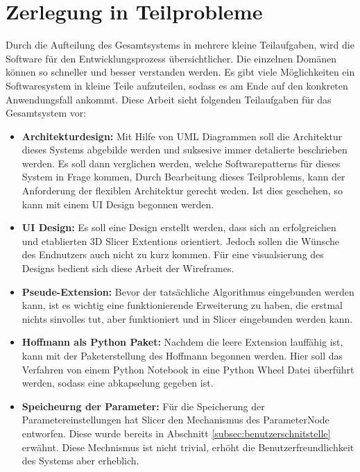 \section{Zerlegung in Teilprobleme}
\label{sec_zerlegung_in_teilprobleme} Durch die Aufteilung des Gesamtsystems in mehrere
kleine Teilaufgaben, wird die Software für den Entwicklungsprozess
übersichtlicher. Die einzelnen Domänen können so schneller und besser verstanden
werden. Es gibt viele Möglichkeiten ein Softwaresystem in kleine Teile
aufzuteilen, sodass es am Ende auf den konkreten Anwendungsfall ankommt. Diese
Arbeit sieht folgenden Teilaufgaben für das Gesamtsystem vor:

\begin{itemize}
	\item \textbf{Architekturdesign:} Mit Hilfe von UML Diagrammen soll die
		Architektur dieses Systems abgebilde werden und suksesive immer detalierte
		beschrieben werden. Es soll dann verglichen werden, welche Softwarepatterns
		für dieses System in Frage kommen, Durch Bearbeitung dieses Teilproblems,
		kann der Anforderung der flexiblen Architektur gerecht weden. Ist dies geschehen,
		so kann mit einem UI Design begonnen werden.

	\item \textbf{UI Design:} Es soll eine Design erstellt werden, dass sich an erfolgreichen
		und etablierten 3D Slicer Extentions orientiert. Jedoch sollen die Wünsche
		des Endnutzers auch nicht zu kurz kommen. Für eine visualsierung des Designs
		bedient sich diese Arbeit der Wireframes.

	\item \textbf{Pseude-Extension:} Bevor der tatsächliche Algorithmus
		eingebunden werden kann, ist es wichtig eine funktionierende Erweiterung zu haben,
		die erstmal nichts sinvolles tut, aber funktioniert und in Slicer eingebunden
		werden kann.

	\item \textbf{Hoffmann als Python Paket:} Nachdem die leere Extension
		lauffähig ist, kann mit der Paketerstellung des Hoffmann begonnen werden.
		Hier soll das Verfahren von einem Python Notebook in eine Python Wheel Datei
		überführt werden, sodass eine abkapselung gegeben ist.

	\item \textbf{Speicheurng der Parameter:} Für die Speicherung der
		Parametereinstellungen hat Slicer den Mechanismus des ParameterNode
		entworfen. Diese wurde bereits in Abschnitt \ref{subsec:benutzerschnitstelle}
		erwähnt. Diese Mechnismus ist nicht trivial, erhöht die Benutzerfreundlichkeit
		des Systems aber erheblich.


\end{itemize}
